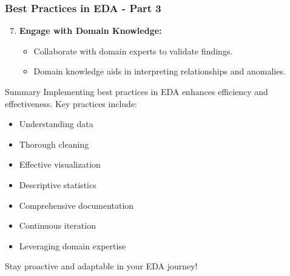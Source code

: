 \documentclass[aspectratio=169]{beamer}
\begin{document}
\begin{frame}[fragile]
    \frametitle{Best Practices in EDA - Part 3}
    \begin{enumerate}
        \setcounter{enumi}{6} %
        \item \textbf{Engage with Domain Knowledge:}
        \begin{itemize}
            \item Collaborate with domain experts to validate findings.
            \item Domain knowledge aids in interpreting relationships and anomalies.
        \end{itemize}
    \end{enumerate}

    \begin{block}{Summary}
        Implementing best practices in EDA enhances efficiency and effectiveness. Key practices include:
        \begin{itemize}
            \item Understanding data
            \item Thorough cleaning
            \item Effective visualization
            \item Descriptive statistics
            \item Comprehensive documentation
            \item Continuous iteration
            \item Leveraging domain expertise
        \end{itemize}
        Stay proactive and adaptable in your EDA journey!
    \end{block}
\end{frame}
\end{document}
